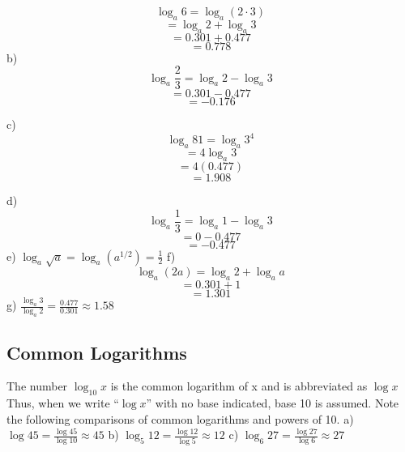 \documentclass{report}
\begin{document}
\bigbreak \noindent
\begin{minipage}{0.5\textwidth}
$$\log _a 6  =\log _a(2 \cdot 3)$$
 $$=\log _a 2+\log _a 3 $$
$$ =0.301+0.477 $$
 $$=0.778$$
 \bigbreak \noindent
b)
$$\log _a \frac{2}{3}  =\log _a 2-\log _a 3$$
 $$=0.301-0.477 $$
$$ =-0.176$$

c)
$$\log _a 81  =\log _a 3^4 $$
 $$=4 \log _a 3 $$
$$ =4(0.477) $$
$$ =1.908$$
\end{minipage}
\begin{minipage}{0.4\textwidth}
d)
$$\log _a \frac{1}{3}  =\log _a 1-\log _a 3 $$
$$ =0-0.477 $$
$$ =-0.477$$
\bigbreak \noindent
e) $\log _a \sqrt{a}=\log _a\left(a^{1 / 2}\right)=\frac{1}{2}$
\bigbreak \noindent
f)
$$\log _a(2 a)  =\log _a 2+\log _a a $$
$$ =0.301+1 $$
$$ =1.301$$
\bigbreak \noindent
g) $\frac{\log _a 3}{\log _a 2}=\frac{0.477}{0.301} \approx 1.58$
\end{minipage}
\pagebreak
\subsection*{Common Logarithms}
The number $\log_{10}x$ is the common logarithm of x and is abbreviated as $\log x$
\bigbreak \noindent
{}
\bigbreak \noindent 
Thus, when we write ``$\log x$'' with no base indicated, base 10 is assumed. Note the following comparisons of common logarithms and powers of 10.
\bigbreak \noindent
{}
\sol 
\bigbreak \noindent
a) $\log 45 = \frac{\log 45}{\log 10} \approx 45$
\bigbreak \noindent
b) $\log_5 12 = \frac{\log 12}{\log 5} \approx 12$
\bigbreak \noindent
c) $\log_6 27 = \frac{\log 27}{\log 6} \approx 27$
\bigbreak \noindent \bigbreak \noindent
\end{document}
